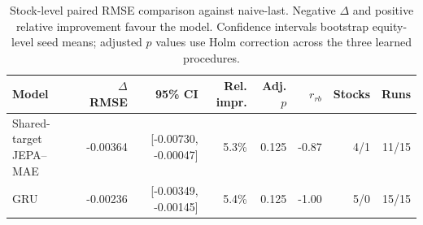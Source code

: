 \begin{table}[t]
\centering
\small
\caption{Stock-level paired RMSE comparison against naive-last. Negative $\Delta$ and positive relative improvement favour the model. Confidence intervals bootstrap equity-level seed means; adjusted $p$ values use Holm correction across the three learned procedures.}
\label{tab:paired_rmse_naive}
\begin{tabular}{lrrrrrrr}
\toprule
Model & $\Delta$RMSE & 95\% CI & Rel. impr. & Adj. $p$ & $r_{rb}$ & Stocks & Runs \\
\midrule
Shared-target JEPA--MAE & -0.00364 & [-0.00730, -0.00047] & 5.3\% & 0.125 & -0.87 & 4/1 & 11/15 \\
GRU & -0.00236 & [-0.00349, -0.00145] & 5.4\% & 0.125 & -1.00 & 5/0 & 15/15 \\
\bottomrule
\end{tabular}
\end{table}
